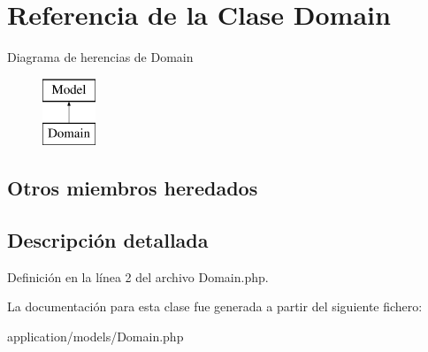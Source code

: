 \hypertarget{class_domain}{}\section{Referencia de la Clase Domain}
\label{class_domain}
Diagrama de herencias de Domain\begin{figure}[H]
\begin{center}
\leavevmode
\includegraphics[height=2.000000cm]{class_domain}
\end{center}
\end{figure}
\subsection*{Otros miembros heredados}


\subsection{Descripción detallada}


Definición en la línea 2 del archivo Domain.\+php.



La documentación para esta clase fue generada a partir del siguiente fichero\+:\begin{DoxyCompactItemize}
\item 
application/models/Domain.\+php\end{DoxyCompactItemize}
